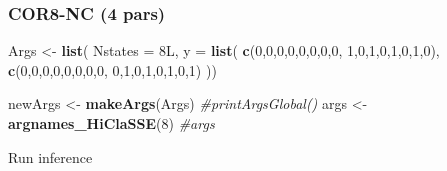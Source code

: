 \documentclass[
]{article}
\newenvironment{Shaded}{\begin{snugshade}}{\end{snugshade}}
\newcommand{\AttributeTok}[1]{\textcolor[rgb]{0.13,0.29,0.53}{#1}}
\newcommand{\CommentTok}[1]{\textcolor[rgb]{0.56,0.35,0.01}{\textit{#1}}}
\newcommand{\DecValTok}[1]{\textcolor[rgb]{0.00,0.00,0.81}{#1}}
\newcommand{\FunctionTok}[1]{\textcolor[rgb]{0.13,0.29,0.53}{\textbf{#1}}}
\newcommand{\NormalTok}[1]{#1}
\newcommand{\OtherTok}[1]{\textcolor[rgb]{0.56,0.35,0.01}{#1}}
\begin{document}
\hypertarget{cor8-nc-4-pars}{%
\subsubsection{COR8-NC (4 pars)}\label{cor8-nc-4-pars}}

\begin{Shaded}
\begin{Highlighting}[]
\NormalTok{Args }\OtherTok{\textless{}{-}} \FunctionTok{list}\NormalTok{(}
  \AttributeTok{Nstates =}\NormalTok{ 8L,}
  \AttributeTok{y =} \FunctionTok{list}\NormalTok{(}
    \FunctionTok{c}\NormalTok{(}\DecValTok{0}\NormalTok{,}\DecValTok{0}\NormalTok{,}\DecValTok{0}\NormalTok{,}\DecValTok{0}\NormalTok{,}\DecValTok{0}\NormalTok{,}\DecValTok{0}\NormalTok{,}\DecValTok{0}\NormalTok{,}\DecValTok{0}\NormalTok{, }\DecValTok{1}\NormalTok{,}\DecValTok{0}\NormalTok{,}\DecValTok{1}\NormalTok{,}\DecValTok{0}\NormalTok{,}\DecValTok{1}\NormalTok{,}\DecValTok{0}\NormalTok{,}\DecValTok{1}\NormalTok{,}\DecValTok{0}\NormalTok{),}
    \FunctionTok{c}\NormalTok{(}\DecValTok{0}\NormalTok{,}\DecValTok{0}\NormalTok{,}\DecValTok{0}\NormalTok{,}\DecValTok{0}\NormalTok{,}\DecValTok{0}\NormalTok{,}\DecValTok{0}\NormalTok{,}\DecValTok{0}\NormalTok{,}\DecValTok{0}\NormalTok{, }\DecValTok{0}\NormalTok{,}\DecValTok{1}\NormalTok{,}\DecValTok{0}\NormalTok{,}\DecValTok{1}\NormalTok{,}\DecValTok{0}\NormalTok{,}\DecValTok{1}\NormalTok{,}\DecValTok{0}\NormalTok{,}\DecValTok{1}\NormalTok{)}
\NormalTok{  ))}

\NormalTok{newArgs }\OtherTok{\textless{}{-}} \FunctionTok{makeArgs}\NormalTok{(Args)}
\CommentTok{\#printArgsGlobal()}
\NormalTok{args }\OtherTok{\textless{}{-}} \FunctionTok{argnames\_HiClaSSE}\NormalTok{(}\DecValTok{8}\NormalTok{)}
\CommentTok{\#args}
\end{Highlighting}
\end{Shaded}

Run inference
\end{document}
